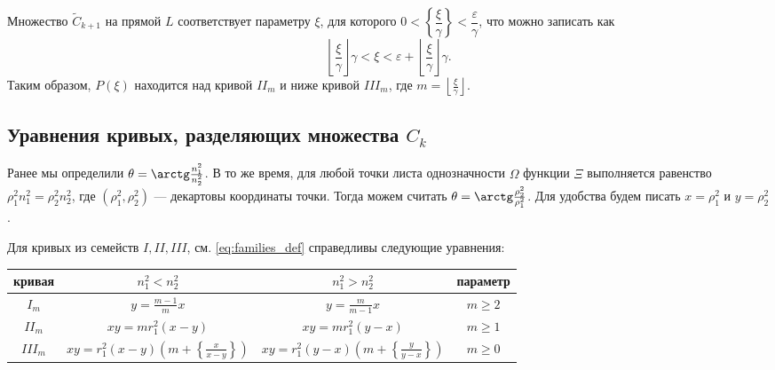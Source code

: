Множество $\widetilde{C}_{k+1}$ на прямой $L$ соответствует параметру $\xi$, для которого $0 <  \left\{ \dfrac{\xi }{\gamma}\right\} < \dfrac{\varepsilon}{\gamma}$, что можно записать как 
$$\left\lfloor \frac{\xi}{\gamma} \right\rfloor \gamma < \xi < \varepsilon + \left\lfloor \frac{\xi}{\gamma} \right\rfloor  \gamma.$$
Таким образом, $P(\xi)$ находится над кривой $II_m$ и ниже  кривой $III_m$, где $m=\left\lfloor \frac{\xi}{\gamma} \right\rfloor$.


\subsection{Уравнения кривых, разделяющих множества $C_k$}\label{s3.5}
Ранее мы определили $\theta = \arctg \frac{n_1^2}{n_2^2}$. В то же время, для любой точки  листа однозначности $\Omega$ функции $\Xi$ выполняется равенство $\rho_1^2 n_1^2 = \rho_2^2 n_2^2$, где $(\rho_1^2, \rho_2^2)$ --- декартовы координаты точки.
Тогда можем считать $\theta = \arctg \frac{\rho_2^2}{\rho_1^2}$. Для удобства будем писать $x = \rho_1^2$ и $y=\rho_2^2$. 

\begin{statement}
Для кривых из семейств $I, II, III$, см. \eqref{eq:families_def} справедливы следующие уравнения:
\begin{center}
\begin{tabular}{|c|c|c|c|}
\hline 
кривая &  $n_1^2 < n_2^2$  	& 	$n_1^2 > n_2^2$				& 	параметр\\ \hline 
\hline 
$I_m$ & 	$y = \frac{m-1}{m} x$  	& 	$y = \frac{m}{m-1}x $ 				&	$m \geq 2$ \\ \hline 
$II_m$ & 	$x y = m r_1^2 (x-y)$  	& 	$xy = m r_1^2(y-x) $ 		&	$m \geq 1$ \\ \hline 
$III_m$ & 	$x y = r_1^2 (x-y) \left( m + \left\{\frac{x}{x-y}\right\}\right)$  	& 	$x y = r_1^2 (y-x) \left( m + \left\{\frac{y}{y-x}\right\}\right) $ 												&	$m \geq 0$ \\ \hline 
\end{tabular}
\end{center}
\label{st:curves_formulas}
\end{statement}

